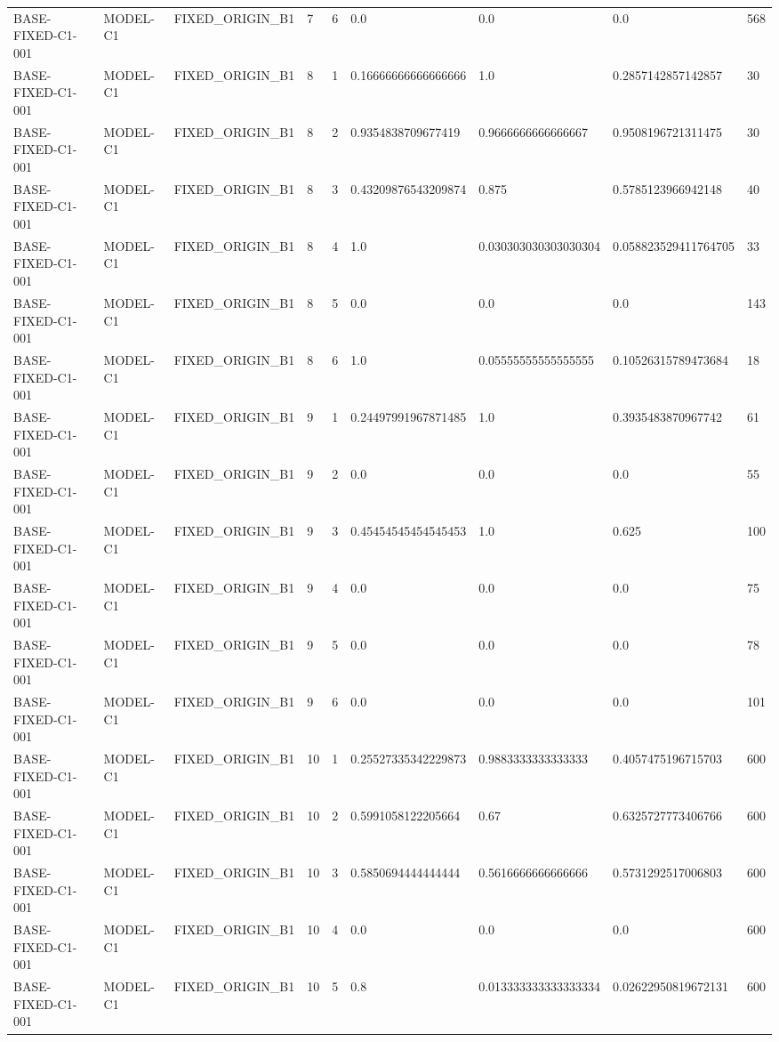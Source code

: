 \begin{tabular}{lllllllll}
BASE-FIXED-C1-001 & MODEL-C1 & FIXED\_ORIGIN\_B1 & 7 & 6 & 0.0 & 0.0 & 0.0 & 568 \\
BASE-FIXED-C1-001 & MODEL-C1 & FIXED\_ORIGIN\_B1 & 8 & 1 & 0.16666666666666666 & 1.0 & 0.2857142857142857 & 30 \\
BASE-FIXED-C1-001 & MODEL-C1 & FIXED\_ORIGIN\_B1 & 8 & 2 & 0.9354838709677419 & 0.9666666666666667 & 0.9508196721311475 & 30 \\
BASE-FIXED-C1-001 & MODEL-C1 & FIXED\_ORIGIN\_B1 & 8 & 3 & 0.43209876543209874 & 0.875 & 0.5785123966942148 & 40 \\
BASE-FIXED-C1-001 & MODEL-C1 & FIXED\_ORIGIN\_B1 & 8 & 4 & 1.0 & 0.030303030303030304 & 0.058823529411764705 & 33 \\
BASE-FIXED-C1-001 & MODEL-C1 & FIXED\_ORIGIN\_B1 & 8 & 5 & 0.0 & 0.0 & 0.0 & 143 \\
BASE-FIXED-C1-001 & MODEL-C1 & FIXED\_ORIGIN\_B1 & 8 & 6 & 1.0 & 0.05555555555555555 & 0.10526315789473684 & 18 \\
BASE-FIXED-C1-001 & MODEL-C1 & FIXED\_ORIGIN\_B1 & 9 & 1 & 0.24497991967871485 & 1.0 & 0.3935483870967742 & 61 \\
BASE-FIXED-C1-001 & MODEL-C1 & FIXED\_ORIGIN\_B1 & 9 & 2 & 0.0 & 0.0 & 0.0 & 55 \\
BASE-FIXED-C1-001 & MODEL-C1 & FIXED\_ORIGIN\_B1 & 9 & 3 & 0.45454545454545453 & 1.0 & 0.625 & 100 \\
BASE-FIXED-C1-001 & MODEL-C1 & FIXED\_ORIGIN\_B1 & 9 & 4 & 0.0 & 0.0 & 0.0 & 75 \\
BASE-FIXED-C1-001 & MODEL-C1 & FIXED\_ORIGIN\_B1 & 9 & 5 & 0.0 & 0.0 & 0.0 & 78 \\
BASE-FIXED-C1-001 & MODEL-C1 & FIXED\_ORIGIN\_B1 & 9 & 6 & 0.0 & 0.0 & 0.0 & 101 \\
BASE-FIXED-C1-001 & MODEL-C1 & FIXED\_ORIGIN\_B1 & 10 & 1 & 0.25527335342229873 & 0.9883333333333333 & 0.4057475196715703 & 600 \\
BASE-FIXED-C1-001 & MODEL-C1 & FIXED\_ORIGIN\_B1 & 10 & 2 & 0.5991058122205664 & 0.67 & 0.6325727773406766 & 600 \\
BASE-FIXED-C1-001 & MODEL-C1 & FIXED\_ORIGIN\_B1 & 10 & 3 & 0.5850694444444444 & 0.5616666666666666 & 0.5731292517006803 & 600 \\
BASE-FIXED-C1-001 & MODEL-C1 & FIXED\_ORIGIN\_B1 & 10 & 4 & 0.0 & 0.0 & 0.0 & 600 \\
BASE-FIXED-C1-001 & MODEL-C1 & FIXED\_ORIGIN\_B1 & 10 & 5 & 0.8 & 0.013333333333333334 & 0.02622950819672131 & 600 \\

\end{tabular}
